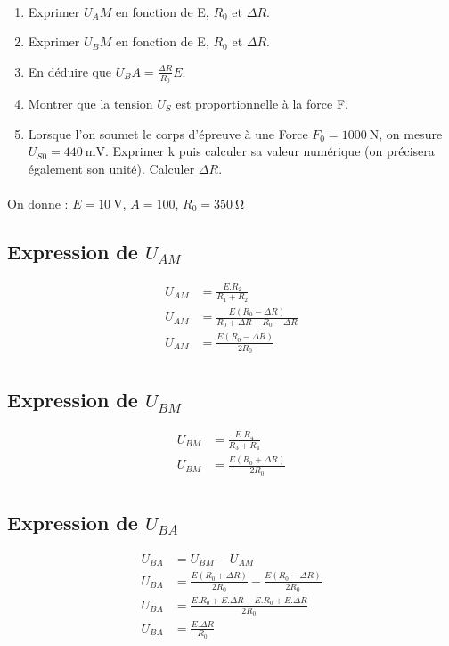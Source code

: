 \documentclass{article}
\begin{document}
\paragraph{}
\begin{enumerate}
    \item Exprimer $U_AM$ en fonction de E, $R_0$ et $\Delta R$.
    \item Exprimer $U_BM$ en fonction de E, $R_0$ et $\Delta R$.
    \item En déduire que $U_BA = \frac{\Delta R}{R_0} E$.
    \item Montrer que la tension $U_S$ est proportionnelle à la force F.
    \item Lorsque l'on soumet le corps d'épreuve à une Force $F_0 = \SI{1000}{\newton}$, on mesure $U_{S0} = \SI{440}{\milli\volt}$. Exprimer k puis calculer sa valeur numérique (on précisera également son unité). Calculer $\Delta R$.
\end{enumerate}

\paragraph{}
On donne : $E = \SI{10}{\volt}$, $A = 100$, $R_0 = \SI{350}{\ohm}$

\subsection{Expression de $U_{AM}$}
\begin{align*}
    U_{AM} & = \frac{E.R_2}{R_1 + R_2}\\
    U_{AM} & = \frac{E(R_0 - \Delta R)}{R_0 + \Delta R + R_0 - \Delta R }\\
    U_{AM} & = \frac{E(R_0 - \Delta R)}{2R_0}\\
\end{align*}

\subsection{Expression de $U_{BM}$}
\begin{align*}
    U_{BM} & = \frac{E.R_4}{R_3 + R_4}\\
    U_{BM} & = \frac{E(R_0 + \Delta R)}{2R_0}\\
\end{align*}

\subsection{Expression de $U_{BA}$}
\begin{align*}
    U_{BA} & = U_{BM} - U_{AM}\\
    U_{BA} & = \frac{E(R_0 + \Delta R)}{2R_0} - \frac{E(R_0 - \Delta R)}{2R_0}\\
    U_{BA} & = \frac{E.R_0 + E.\Delta R - E.R_0 + E.\Delta R}{2R_0}\\
    U_{BA} & = \frac{E.\Delta R}{R_0}\\
\end{align*}
\end{document}
